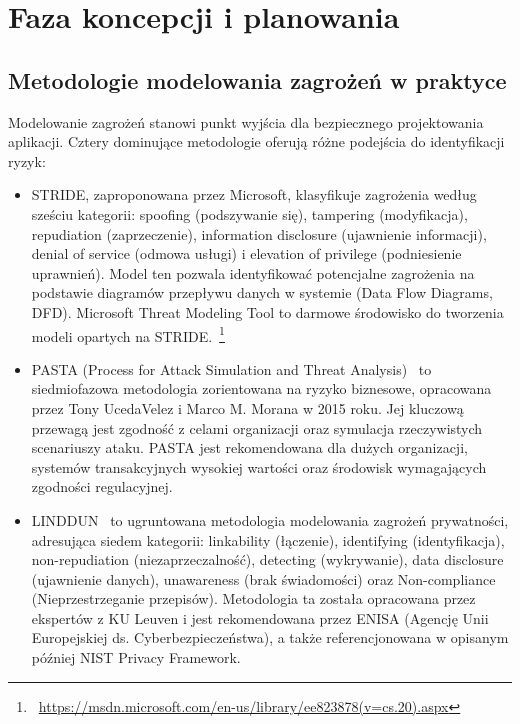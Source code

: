 \section{Faza koncepcji i planowania}

\subsection{Metodologie modelowania zagrożeń w praktyce}

Modelowanie zagrożeń stanowi punkt wyjścia dla bezpiecznego projektowania aplikacji. Cztery dominujące metodologie oferują różne podejścia do identyfikacji ryzyk:

\begin{itemize}

\item  STRIDE, zaproponowana przez Microsoft, klasyfikuje zagrożenia według sześciu kategorii:  spoofing (podszywanie się), tampering (modyfikacja), repudiation (zaprzeczenie), information disclosure (ujawnienie informacji), denial of service (odmowa usługi) i elevation of privilege (podniesienie uprawnień). Model ten pozwala identyfikować potencjalne zagrożenia na podstawie diagramów przepływu danych w systemie (Data Flow Diagrams, DFD). Microsoft Threat Modeling Tool to darmowe środowisko do tworzenia modeli opartych na STRIDE.~\footnote{~\url{https://msdn.microsoft.com/en-us/library/ee823878(v=cs.20).aspx}}

\item PASTA (Process for Attack Simulation and Threat Analysis)~\cite{UcedaVelez2015} to siedmiofazowa metodologia zorientowana na ryzyko biznesowe, opracowana przez Tony UcedaVelez i  Marco M. Morana w 2015 roku. Jej kluczową przewagą jest zgodność z celami organizacji oraz symulacja rzeczywistych scenariuszy ataku. PASTA jest rekomendowana dla dużych organizacji, systemów transakcyjnych wysokiej wartości oraz środowisk wymagających zgodności regulacyjnej.

\item LINDDUN~\cite{RoblesGonzalez2020} to ugruntowana metodologia modelowania zagrożeń prywatności, adresująca siedem kategorii: linkability (łączenie), identifying (identyfikacja), non-repudiation (niezaprzeczalność), detecting (wykrywanie), data disclosure (ujawnienie danych), unawareness (brak świadomości) oraz Non-compliance (Nieprzestrzeganie przepisów). Metodologia ta została opracowana przez ekspertów z KU Leuven i jest rekomendowana przez ENISA (Agencję Unii Europejskiej ds. Cyberbezpieczeństwa), a także referencjonowana w opisanym później NIST Privacy Framework.


\end{itemize}
